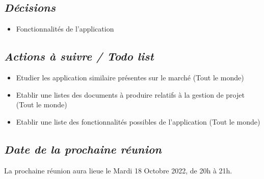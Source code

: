 \documentclass[french,a4paper]{article}
\begin{document}
\subsection*{\textit{Décisions}}
\begin{itemize}
  \item Fonctionnalités de l'application
\end{itemize}

\subsection*{\textit{Actions à suivre / Todo list}}
\begin{itemize}
  \item Etudier les application similaire présentes sur le marché (Tout le monde)
  \item Etablir une listes des documents à produire relatifs à la gestion de projet (Tout le monde)
  \item Etablir une liste des fonctionnalités possibles de l'application (Tout le monde)
\end{itemize}

\subsection*{\textit{Date de la prochaine réunion}}
La prochaine réunion aura lieue le Mardi 18 Octobre 2022, de 20h à 21h.
\end{document}
